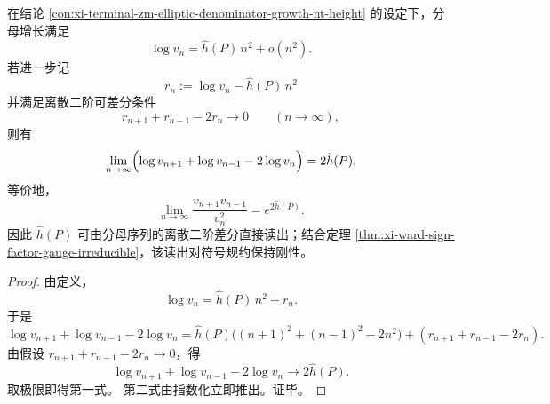\begin{corollary}\label{cor:xi-elliptic-denominator-second-difference-height-readout}
在结论 \ref{con:xi-terminal-zm-elliptic-denominator-growth-nt-height} 的设定下，分母增长满足
\[
\log v_n=\hat h(P)\,n^2+o(n^2).
\]
若进一步记
\[
r_n:=\log v_n-\hat h(P)\,n^2
\]
并满足离散二阶可差分条件
\[
r_{n+1}+r_{n-1}-2r_n\to 0\qquad(n\to\infty),
\]
则有
\[
\lim_{n\to\infty}\Bigl(\log v_{n+1}+\log v_{n-1}-2\log v_n\Bigr)=2\hat h(P),
\]
等价地，
\[
\lim_{n\to\infty}\frac{v_{n+1}v_{n-1}}{v_n^2}=e^{2\hat h(P)}.
\]
因此 \(\hat h(P)\) 可由分母序列的离散二阶差分直接读出；结合定理 \ref{thm:xi-ward-sign-factor-gauge-irreducible}，该读出对符号规约保持刚性。
\end{corollary}
\begin{proof}
由定义，
\[
\log v_n=\hat h(P)\,n^2+r_n.
\]
于是
\[
\log v_{n+1}+\log v_{n-1}-2\log v_n
=\hat h(P)\bigl((n+1)^2+(n-1)^2-2n^2\bigr)
+(r_{n+1}+r_{n-1}-2r_n).
\]
由假设 \(r_{n+1}+r_{n-1}-2r_n\to 0\)，得
\[
\log v_{n+1}+\log v_{n-1}-2\log v_n\to 2\hat h(P).
\]
取极限即得第一式。
第二式由指数化立即推出。证毕。
\end{proof}



\endinput
